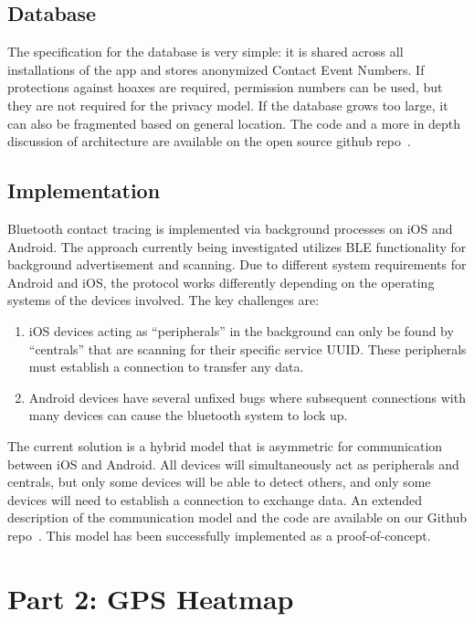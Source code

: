 \documentclass[11pt]{article}
\begin{document}
\subsection{Database}


The specification for the database is very simple: it is shared across all installations of the app and stores anonymized Contact Event Numbers. If protections against hoaxes are required, permission numbers can be used, but they are not required for the privacy model. If the database grows too large, it can also be fragmented based on general location. The code and a more in depth discussion of architecture are available on the open source github repo~\cite{covidwatch}.

\subsection{Implementation}

Bluetooth contact tracing is implemented via background processes on iOS and Android. The approach currently being investigated utilizes BLE functionality for background advertisement and scanning. Due to different system requirements for Android and iOS, the protocol works differently depending on the operating systems of the devices involved. The key challenges are:

\begin{enumerate}
\item iOS devices acting as ``peripherals'' in the background can only be found by ``centrals'' that are scanning for their specific service UUID. These peripherals must establish a connection to transfer any data.
\item Android devices have several unfixed bugs where subsequent connections with many devices can cause the bluetooth system to lock up.
\end{enumerate} 


The current solution is a hybrid model that is asymmetric for communication between iOS and Android. All devices will simultaneously act as peripherals and centrals, but only some devices will be able to detect others, and only some devices will need to establish a connection to exchange data. An extended description of the communication model and the code are available on our Github repo~\cite{covidwatch}. This model has been successfully implemented as a proof-of-concept.

\section{Part 2: GPS Heatmap}
\end{document}
